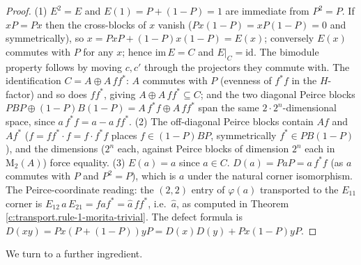 \documentclass[11pt]{article}
\theoremstyle{definition}
\theoremstyle{plain}
\providecommand{\Mat}{}\renewcommand{\Mat}{\mathrm{M}}
\begin{document}
\begin{proof}
(1) $E^2 = E$ and $E(1) = P + (1-P) = 1$ are immediate from $P^2 = P$. If $xP = Px$ then the cross-blocks of $x$ vanish ($Px(1-P) = xP(1-P) = 0$ and symmetrically), so $x = PxP + (1-P)x(1-P) = E(x)$; conversely $E(x)$ commutes with $P$ for any $x$; hence $\mathrm{im}\,E = C$ and $E|_C = \mathrm{id}$. The bimodule property follows by moving $c, c'$ through the projectors they commute with. The identification $C = A \oplus A\,ff^*$: $A$ commutes with $P$ (evenness of $f^*f$ in the $H$-factor) and so does $ff^*$, giving $A \oplus A\,ff^* \subseteq C$; and the two diagonal Peirce blocks $PBP \oplus (1-P)B(1-P) = A\,f^*f \oplus A\,ff^*$ span the same $2 \cdot 2^n$-dimensional space, since $a\,f^*f = a - a\,ff^*$. (2) The off-diagonal Peirce blocks contain $Af$ and $Af^*$ ($f = ff^*\cdot f = f \cdot f^*f$ places $f \in (1-P)BP$, symmetrically $f^* \in PB(1-P)$), and the dimensions ($2^n$ each, against Peirce blocks of dimension $2^n$ each in $\Mat_2(A)$) force equality. (3) $E(a) = a$ since $a \in C$. $D(a) = P a P = a\,f^*f$ (as $a$ commutes with $P$ and $P^2 = P$), which is $a$ under the natural corner isomorphism. The Peirce-coordinate reading: the $(2,2)$ entry of $\varphi(a)$ transported to the $E_{11}$ corner is $E_{12}\,a\,E_{21} = f a f^* = \hat{a}\,ff^*$, i.e.\ $\hat{a}$, as computed in Theorem \ref{c:transport.rule-1-morita-trivial}. The defect formula is $D(xy) = Px(P + (1-P))yP = D(x)D(y) + Px(1-P)yP$.

\end{proof}

We turn to a further ingredient.
\end{document}

